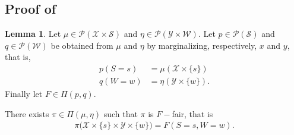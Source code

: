 \documentclass{article}
\theoremstyle{definition}
\newtheorem{lemma}[theorem]{Lemma}
\begin{document}
\subsection{Proof of~}\label{proof:uniquess_existence_fair_ot}
\begin{lemma}\label{lemma:non_emptiness} Let $\mu\in \mathcal{P}(\mathcal{X}\times \mathcal{S})$ and $\mathcal{\eta}\in \mathcal{P}(\mathcal{Y}\times \mathcal{W})$. Let $p\in \mathcal{P}(\mathcal{S})$ and $q\in \mathcal{P}(\mathcal{W})$ be obtained from $\mu$ and $\eta$ by marginalizing, respectively, $x$ and $y$, that is,
\begin{align}\label{eq:S-maginal}
p(S=s)&=\mu(\mathcal{X}\times \lbrace s\rbrace)\\
    \label{eq:w-marginal}q(W=w)&=\eta(\mathcal{Y}\times \lbrace w\rbrace).
\end{align}
Finally let $F\in \Pi(p,q)$. 

There exists $\pi \in \Pi(\mu,\eta)$ such that $\pi$ is $F-$fair, that is
\begin{align*}
\pi\big(\mathcal{\mathcal{X}}\times \lbrace s \rbrace \times \mathcal{\mathcal{Y}}\times \lbrace w \rbrace\big)= F(S=s,W=w).
\end{align*}
\end{lemma}
\end{document}
